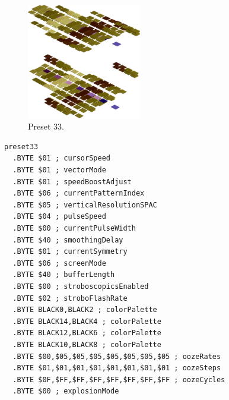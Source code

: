 \clearpage
\begin{minipage}[b]{0.48\linewidth}
\begin{figure}[H]                                                          
  \centering                                                             
  \begin{adjustbox}{width=5cm,center}                                   
  \includegraphics[width=5cm]{src/colorspace_presets/preset33-45.png}%
  \end{adjustbox}                                                        
\caption*{Preset 33.}                                           
\end{figure}                                                               
\end{minipage}
\hspace{0.1cm}
\begin{minipage}[b]{0.48\linewidth}                            
\begin{lstlisting}[basicstyle=\ttfamily\tiny]
preset33
  .BYTE $01 ; cursorSpeed
  .BYTE $01 ; vectorMode
  .BYTE $01 ; speedBoostAdjust
  .BYTE $06 ; currentPatternIndex
  .BYTE $05 ; verticalResolutionSPAC
  .BYTE $04 ; pulseSpeed
  .BYTE $00 ; currentPulseWidth
  .BYTE $40 ; smoothingDelay
  .BYTE $01 ; currentSymmetry
  .BYTE $06 ; screenMode
  .BYTE $40 ; bufferLength
  .BYTE $00 ; stroboscopicsEnabled
  .BYTE $02 ; stroboFlashRate
  .BYTE BLACK0,BLACK2 ; colorPalette
  .BYTE BLACK14,BLACK4 ; colorPalette
  .BYTE BLACK12,BLACK6 ; colorPalette
  .BYTE BLACK10,BLACK8 ; colorPalette
  .BYTE $00,$05,$05,$05,$05,$05,$05,$05 ; oozeRates
  .BYTE $01,$01,$01,$01,$01,$01,$01,$01 ; oozeSteps
  .BYTE $0F,$FF,$FF,$FF,$FF,$FF,$FF,$FF ; oozeCycles
  .BYTE $00 ; explosionMode
\end{lstlisting}
\end{minipage}

\vspace*{-0.5cm}

